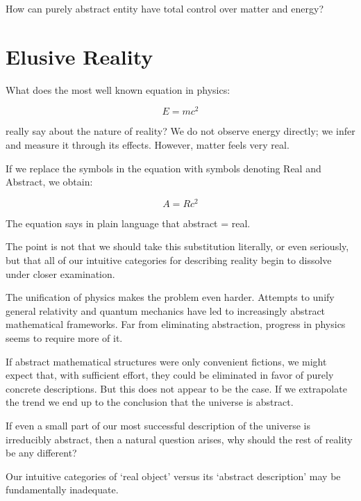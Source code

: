 How can purely abstract entity have total control over matter and energy? 


\section{Elusive Reality}

What does the most well known equation in physics:

\[
E=mc^2
\]

really say about the nature of reality? We do not observe energy directly; we infer and measure it through its effects. However, matter feels very real.

If we replace the symbols in the equation with symbols denoting Real and Abstract, we obtain:

\[
A=Rc^2
\]

The equation says in plain language that abstract = real.

The point is not that we should take this substitution literally, or even seriously, but that all of our intuitive categories for describing reality begin to dissolve under closer examination.

The unification of physics makes the problem even harder. Attempts to unify general relativity and quantum mechanics have led to increasingly
abstract mathematical frameworks. Far from eliminating abstraction, progress in physics seems to require more of it.

If abstract mathematical structures were only convenient fictions, we might expect that, with sufficient effort, they could be eliminated in favor of purely concrete descriptions.
But this does not appear to be the case. If we extrapolate the trend we end up to the conclusion that the universe is abstract.

If even a small part of our most successful description of the universe is irreducibly abstract, then a natural question arises, why should the rest of reality be any different?

Our intuitive categories of ‘real object’ versus its ‘abstract description’ may be fundamentally inadequate.
